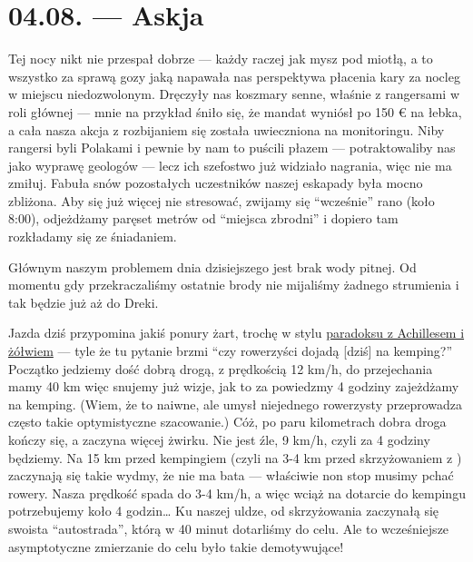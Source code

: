 \chapter*{04.08. --- Askja}

Tej nocy nikt nie przespał dobrze --- każdy raczej jak mysz pod miotłą, a to wszystko za sprawą gozy jaką  napawała nas perspektywa płacenia kary za nocleg w miejscu niedozwolonym. Dręczyły nas koszmary senne, właśnie z rangersami w roli głównej --- mnie na przykład śniło się, że mandat wyniósł po 150 € na łebka, a cała nasza akcja z rozbijaniem się została uwieczniona na monitoringu. Niby rangersi byli Polakami i pewnie by nam to puścili płazem --- potraktowaliby nas jako wyprawę geologów --- lecz ich szefostwo już widziało nagrania, więc nie ma zmiłuj. Fabuła snów pozostałych uczestników naszej eskapady była mocno zbliżona. Aby się już więcej nie stresować, zwijamy się “wcześnie” rano (koło 8:00), odjeżdżamy paręset metrów od “miejsca zbrodni” i dopiero tam rozkładamy się ze śniadaniem.

Głównym naszym problemem dnia dzisiejszego jest brak wody pitnej. Od momentu gdy przekraczaliśmy ostatnie brody nie mijaliśmy żadnego strumienia i tak będzie już aż do Dreki.



Jazda dziś przypomina jakiś ponury żart, trochę w stylu \href{http://pl.wikipedia.org/wiki/Paradoksy_Zenona_z_Elei#Achilles_i_.C5.BC.C3.B3.C5.82w.5B2.5D}{paradoksu z Achillesem i żółwiem} --- tyle że tu pytanie brzmi “czy rowerzyści dojadą [dziś] na kemping?” Początko jedziemy dość dobrą drogą, z prędkością 12 km/h, do przejechania mamy 40 km więc snujemy już wizje, jak to za powiedzmy 4 godziny zajeżdżamy na kemping. (Wiem, że to naiwne, ale umysł niejednego rowerzysty przeprowadza często takie optymistyczne szacowanie.) Cóż, po paru kilometrach dobra droga kończy się, a zaczyna więcej żwirku. Nie jest źle, 9 km/h, czyli za 4 godziny będziemy. Na 15 km przed kempingiem (czyli na 3-4 km przed skrzyżowaniem z ) zaczynają się takie wydmy, że nie ma bata --- właściwie non stop musimy pchać rowery. Nasza prędkość spada do 3-4 km/h, a więc wciąż na dotarcie do kempingu potrzebujemy koło 4 godzin… Ku naszej uldze, od skrzyżowania zaczynałą się swoista “autostrada”, którą w 40 minut dotarliśmy do celu. Ale to wcześniejsze asymptotyczne zmierzanie do celu było takie demotywujące!

